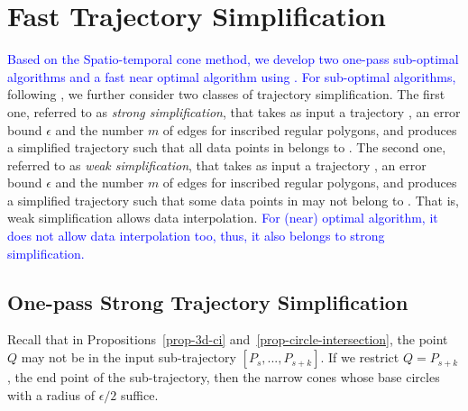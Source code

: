 \section{Fast Trajectory Simplification}

\label{sec-alg}
\textcolor{blue}{Based on the Spatio-temporal cone method, we develop two one-pass sub-optimal algorithms and a fast near optimal algorithm using \sed. For sub-optimal algorithms,} following \cite{Trajcevski:DDR,Lin:Operb}, we further consider two classes of trajectory simplification.
The first one, referred to as \emph{strong simplification}, that takes as input a trajectory , an error bound $\epsilon$ and the number $m$ of edges for inscribed regular polygons, and produces a simplified trajectory  such that all data points in  belongs to .
The second one, referred to as \emph{weak simplification}, that takes as input a trajectory , an error bound $\epsilon$ and the number $m$ of edges for inscribed regular polygons, and produces a simplified trajectory  such that some data points in  may not belong to . That is, weak simplification allows data interpolation. 
\textcolor{blue}{For (near) optimal algorithm, it does not allow data interpolation too, thus, it also belongs to strong simplification.}



\subsection{One-pass Strong Trajectory Simplification}
Recall that in Propositions~\ref{prop-3d-ci} and~\ref{prop-circle-intersection}, the point $Q$ may not be in the input sub-trajectory $[P_s,...,P_{s+k}]$.
If we restrict $Q=P_{s+k}$, the end point of the sub-trajectory, then the narrow cones whose base circles with a radius of $\epsilon/2$ suffice.

